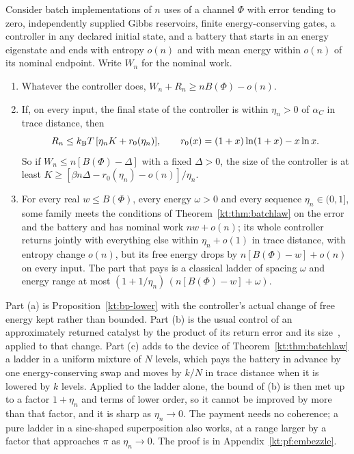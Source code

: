 \begin{corollary}\label{kt:cor:embezzle}
Consider batch implementations of $n$ uses of a channel $\Phi$ with error tending to zero, independently supplied Gibbs reservoirs, finite energy-conserving gates, a controller in any declared initial state, and a battery that starts in an energy eigenstate and ends with entropy $o(n)$ and with mean energy within $o(n)$ of its nominal endpoint. Write $W_n$ for the nominal work.
\begin{enumerate}[label=(\alph*)]
\item Whatever the controller does, $W_n+R_n\ge nB(\Phi)-o(n)$.
\item If, on every input, the final state of the controller is within $\eta_n>0$ of $\alpha_C$ in trace distance, then
\[
R_n\le k_{\mathrm B} T\,[\eta_nK+r_0(\eta_n)],\qquad r_0(x)=(1+x)\ln(1+x)-x\ln x.
\]
So if $W_n\le n[B(\Phi)-\Delta]$ with a fixed $\Delta>0$, the size of the controller is at least $K\ge[\beta n\Delta-r_0(\eta_n)-o(n)]/\eta_n$.
\item For every real $w\le B(\Phi)$, every energy $\omega>0$ and every sequence $\eta_n\in(0,1]$, some family meets the conditions of Theorem~\ref{kt:thm:batchlaw} on the error and the battery and has nominal work $nw+o(n)$; its whole controller returns jointly with everything else within $\eta_n+o(1)$ in trace distance, with entropy change $o(n)$, but its free energy drops by $n[B(\Phi)-w]+o(n)$ on every input. The part that pays is a classical ladder of spacing $\omega$ and energy range at most $(1+1/\eta_n)\,(n[B(\Phi)-w]+\omega)$.
\end{enumerate}
\end{corollary}

Part (a) is Proposition~\ref{kt:bp-lower} with the controller's actual change of free energy kept rather than bounded. Part (b) is the usual control of an approximately returned catalyst by the product of its return error and its size~\cite{BrandaoSecondLaws15,NgCatalysis15}, applied to that change. Part (c) adds to the device of Theorem~\ref{kt:thm:batchlaw} a ladder in a uniform mixture of $N$ levels, which pays the battery in advance by one energy-conserving swap and moves by $k/N$ in trace distance when it is lowered by $k$ levels. Applied to the ladder alone, the bound of (b) is then met up to a factor $1+\eta_n$ and terms of lower order, so it cannot be improved by more than that factor, and it is sharp as $\eta_n\to0$. The payment needs no coherence; a pure ladder in a sine-shaped superposition also works, at a range larger by a factor that approaches $\pi$ as $\eta_n\to0$. The proof is in Appendix~\ref{kt:pf:embezzle}.


